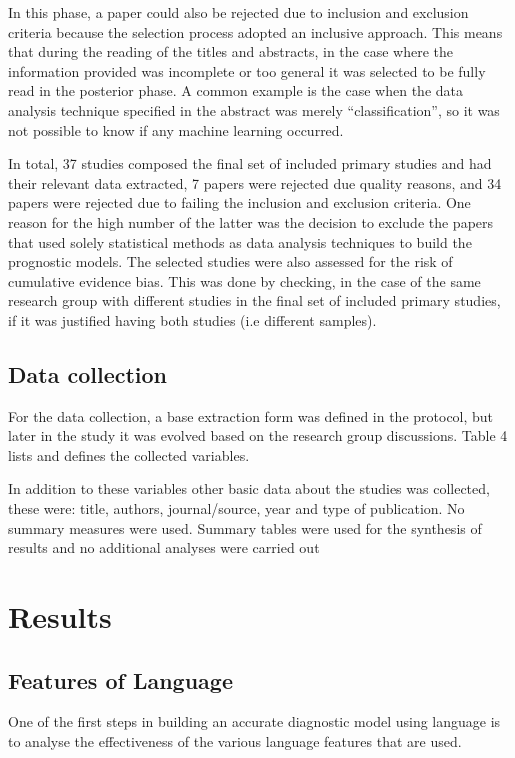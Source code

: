 \documentclass[10pt, letterpaper, twoside, openany]{thesis}
\begin{document}
In this phase, a paper could also be rejected due to inclusion and exclusion criteria because the selection process adopted an inclusive approach. This means that during the reading of the titles and abstracts, in the case where the information provided was incomplete or too general it was selected to be fully read in the posterior phase. A common example is the case when the data analysis technique specified in the abstract was merely “classification”, so it was not possible to know if any machine learning occurred.
\par
In total, 37 studies composed the final set of included primary studies and had their relevant data extracted, 7 papers were rejected due quality reasons, and 34 papers were rejected due to failing the inclusion and exclusion criteria. One reason for the high number of the latter was the decision to exclude the papers that used solely statistical methods as data analysis techniques to build the prognostic models. The selected studies were also assessed for the risk of cumulative evidence bias. This was done by checking, in the case of the same research group with different studies in the final set of included primary studies, if it was justified having both studies (i.e different samples).

\subsection{Data collection}
For the data collection, a base extraction form was defined in the protocol, but later in the study it was evolved based on the research group discussions. Table 4 lists and defines the collected variables.


In addition to these variables other basic data about the studies was collected, these were: title, authors, journal/source, year and type of publication. No summary measures were used. Summary tables were used for the synthesis of results and no additional analyses were carried out

\section{Results}\label{results}
\subsection{Features of Language}
One of the first steps in building an accurate diagnostic model using language is to analyse the effectiveness of the various language features that are used.
\end{document}
